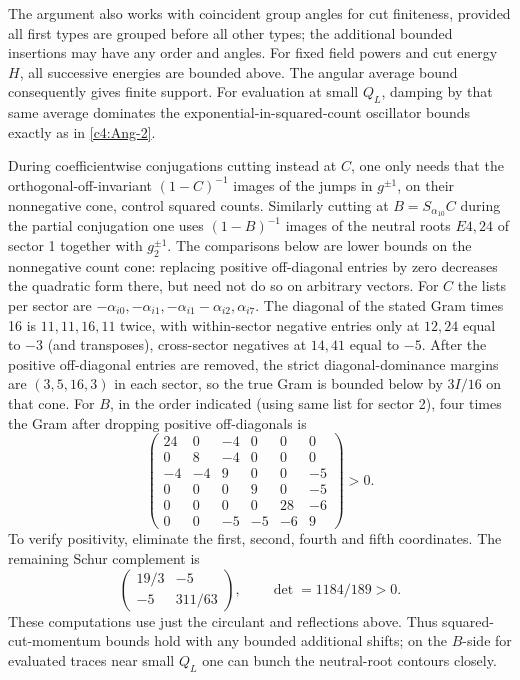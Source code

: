 The argument also works with coincident group angles for cut finiteness,
provided all first types are grouped before all other types; the
additional bounded insertions may have any order and angles. For fixed
field powers and cut energy \(H\), all successive energies are bounded
above. The angular average bound consequently gives finite support. For
evaluation at small \(Q_L\), damping by that same average dominates the
exponential-in-squared-count oscillator bounds exactly as in
\eqref{c4:Ang-2}.

During coefficientwise conjugations cutting instead at \(C\), one only needs that the orthogonal-off-invariant \((1-C)^{-1}\) images of the jumps in \(g^{\pm1}\), on their nonnegative cone, control squared counts. Similarly cutting at \(B=S_{\alpha_{10}}C\) during the partial conjugation one uses \((1-B)^{-1}\) images of the neutral roots \(E4,24\) of sector 1 together with \(g_2^{\pm1}\). The comparisons below are lower bounds on the nonnegative count cone: replacing positive off-diagonal entries by zero decreases the quadratic form there, but need not do so on arbitrary vectors. For \(C\) the lists per sector are \(-\alpha_{i0},-\alpha_{i1},-\alpha_{i1}-\alpha_{i2},\alpha_{i7}\). The diagonal of the stated Gram times 16 is \(11,11,16,11\) twice, with within-sector negative entries only at \(12,24\) equal to \(-3\) (and transposes), cross-sector negatives at \(14,41\) equal to \(-5\). After the positive off-diagonal entries are removed, the strict diagonal-dominance margins are \((3,5,16,3)\) in each sector, so the true Gram is bounded below by \(3I/16\) on that cone. For \(B\), in the order indicated (using same list for sector 2), four times the Gram after dropping positive off-diagonals is
\[
 \begin{pmatrix}
24&0&-4&0&0&0\\0&8&-4&0&0&0\\-4&-4&9&0&0&-5\\
0&0&0&9&0&-5\\0&0&0&0&28&-6\\0&0&-5&-5&-6&9
 \end{pmatrix}>0.
\]
To verify positivity, eliminate the first, second, fourth and fifth coordinates. The remaining Schur complement is
\[
 \begin{pmatrix}19/3&-5\\-5&311/63\end{pmatrix},
 \qquad \det=1184/189>0.
\]
These computations use just the circulant and reflections above. Thus squared-cut-momentum bounds hold with any bounded additional shifts; on the \(B\)-side for evaluated traces near small \(Q_L\) one can bunch the neutral-root contours closely.

